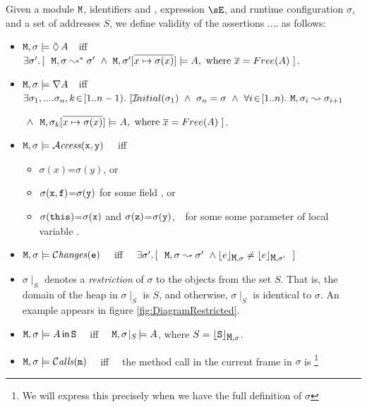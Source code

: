 \begin{definition}
\label{def:permission}
Given a module ${\mbox{\tt{M}}}$, identifiers  and , expression $\sE$, and runtime configuration $\sigma$, and a set of addresses $S$,
we define validity of the assertions   .... as follows:

\begin{itemize}
\item
${\mbox{\tt{M}}},\sigma \models  \lozenge\, A$\ \ iff\ \  $\exists \sigma'.\, [\ \ \M,\sigma \leadsto^* \sigma' \ \wedge \ \M,\sigma' [\overline{x \mapsto \sigma(x)}]\models \A, \mbox{ where } \overline{x}=Free(\A)\   ]$.
\item
${\mbox{\tt{M}}},\sigma \models  \nabla A$\ \   iff\ \  $\exists \sigma_1,....\sigma_n, k\!\in\![1..n-1).\ [ \Initial {\sigma_1}\  \wedge\ \sigma_n=\sigma\ \wedge\ \forall i\!\in\![1..n).\ \M,\sigma_i\leadsto  \sigma_{i+1}  $\\
\strut \hspace{5.7cm} $\ \wedge \  \ {\mbox{\tt{M}}},\sigma_k[\overline{x \mapsto \sigma(x)}]\models A, \mbox{ where } \overline{x}=Free(A)\  ]$.
\item
${\mbox{\tt{M}}},\sigma \models   {\mathcal{A}}\textrm{\textit{ccess}}({\mbox{\tt{x}}},{\mbox{\tt{y}}})$   \ \ iff  \begin{itemize}
\item
$\sigma(x)$=$\sigma(y)$, or
\item
$\sigma({\mbox{\tt{x}}},{\mbox{\tt{f}}})$=$\sigma({\mbox{\tt{y}}})$  for some field ,  or
\item
$\sigma({\mbox{\tt{this}}})$=$\sigma({\mbox{\tt{x}}})$ and
  $\sigma({\mbox{\tt{z}}})$=$\sigma({\mbox{\tt{y}}})$,
  $\strut \hspace{0.1cm}$
for some some parameter of local variable .
 \end{itemize}
 \item
 ${\mbox{\tt{M}}},\sigma \models   \mathcal{C}\textrm{\textit{hanges}}({\mbox{\tt{e}}})$   \ \ iff \  \
 $\exists \sigma'.\, [\ \ \M,\sigma \leadsto \sigma' \ \wedge \interp{e}{\M,\sigma} \neq \interp{e}{\M,\sigma'}\ \ ]$


\item
 $\sigma\!\mid_S$ denotes a {\em restriction} of $\sigma$ to the objects from the set $S$. That is, the domain of
 the heap in $\sigma\mid_S$ is $S$, and otherwise,  $\sigma\mid_S$ is identical to $\sigma$. An example appears in figure \ref{fig:DiagramRestricted}.
 \item
${\mbox{\tt{M}}},\sigma  \models A\,{\bf{\sf {in}}}\, {\mbox{\tt{S}}}$  \  \ iff \ \
  $ {\mbox{\tt{M}}},\sigma\!\mid_S\, \models A $, where   $S={\lfloor{ {{\mbox{\tt{S}}}}}\rfloor_{{\mbox{\tt{M}}},\sigma}} $.
 \item
 ${\mbox{\tt{M}}},\sigma  \models {\mathcal{C}}\textrm{\textit{alls}}({\mbox{\tt{m}}})$ \ \ iff \ \ the method call in the current frame in $\sigma$ is
 \footnote{We will express this precisely  when we have the full definition of $\sigma$}
\end{itemize}
\end{definition}

